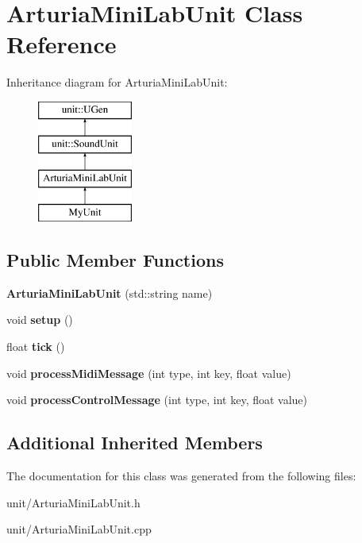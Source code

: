 \hypertarget{classArturiaMiniLabUnit}{}\section{Arturia\+Mini\+Lab\+Unit Class Reference}
\label{classArturiaMiniLabUnit}
Inheritance diagram for Arturia\+Mini\+Lab\+Unit\+:\begin{figure}[H]
\begin{center}
\leavevmode
\includegraphics[height=4.000000cm]{classArturiaMiniLabUnit}
\end{center}
\end{figure}
\subsection*{Public Member Functions}
\begin{DoxyCompactItemize}
\item 
{\bfseries Arturia\+Mini\+Lab\+Unit} (std\+::string name)\hypertarget{classArturiaMiniLabUnit_aeb63b33d9631976240fd38d36935b44c}{}\label{classArturiaMiniLabUnit_aeb63b33d9631976240fd38d36935b44c}

\item 
void {\bfseries setup} ()\hypertarget{classArturiaMiniLabUnit_ae7590bc31683c4dc12b0a1396c53c6b4}{}\label{classArturiaMiniLabUnit_ae7590bc31683c4dc12b0a1396c53c6b4}

\item 
float {\bfseries tick} ()\hypertarget{classArturiaMiniLabUnit_a5d9365ac51fa7f46fdbd53c4f473bfcd}{}\label{classArturiaMiniLabUnit_a5d9365ac51fa7f46fdbd53c4f473bfcd}

\item 
void {\bfseries process\+Midi\+Message} (int type, int key, float value)\hypertarget{classArturiaMiniLabUnit_a0bb1d1b81bb3faf7ee141b941cf84457}{}\label{classArturiaMiniLabUnit_a0bb1d1b81bb3faf7ee141b941cf84457}

\item 
void {\bfseries process\+Control\+Message} (int type, int key, float value)\hypertarget{classArturiaMiniLabUnit_ad8f03d0e1bbe21f115f99c156c0f2d06}{}\label{classArturiaMiniLabUnit_ad8f03d0e1bbe21f115f99c156c0f2d06}

\end{DoxyCompactItemize}
\subsection*{Additional Inherited Members}


The documentation for this class was generated from the following files\+:\begin{DoxyCompactItemize}
\item 
unit/Arturia\+Mini\+Lab\+Unit.\+h\item 
unit/Arturia\+Mini\+Lab\+Unit.\+cpp\end{DoxyCompactItemize}
